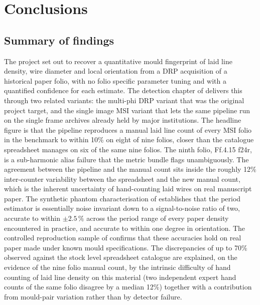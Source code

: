 \section{Conclusions}
\label{sec:conclusion}


\subsection{Summary of findings}
\label{sec:conclusion:findings}

The project set out to recover a quantitative mould fingerprint of
laid line density, wire diameter and local orientation from a DRP
acquisition of a historical paper folio, with no folio specific
parameter tuning and with a quantified confidence for each
estimate. The detection chapter of  delivers
this through two related variants: the multi-phi DRP variant that
was the original project target, and the single image MSI variant
that lets the same pipeline run on the single frame archives
already held by major institutions. The headline figure is that
the pipeline reproduces a manual laid line count of every MSI
folio in the benchmark to within 10\% on eight of nine
folios, closer than the catalogue spreadsheet manages on six of
the same nine folios. The ninth folio, Ff.4.15 f24r, is a
sub-harmonic alias failure that the metric bundle flags
unambiguously. The agreement between the pipeline and the
manual count sits inside the roughly 12\%
inter-counter variability between the spreadsheet and the new
manual count, which is the inherent uncertainty of hand-counting
laid wires on real manuscript paper. The synthetic phantom
characterisation of  establishes that
the period estimator is essentially noise invariant down to a
signal-to-noise ratio of two, accurate to within $\pm 2.5\,\%$
across the period range of every paper density encountered in
practice, and accurate to within one degree in orientation. The
controlled reproduction sample of 
confirms that these accuracies hold on real paper made under
known mould specifications. The discrepancies of up to 70\%
 observed against the stock level spreadsheet catalogue
are explained, on the evidence of the nine folio manual count,
by the intrinsic difficulty of hand counting of laid line density on this
material (two independent expert hand counts of the same folio
disagree by a median 12\%) together with a contribution
from mould-pair variation rather than by detector
failure.

